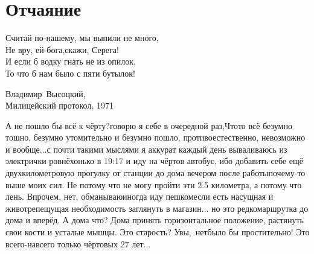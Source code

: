 \chapter{Отчаяние} 
\vepsianrose

\setlength{\epigraphwidth}{0.7\textwidth}

\epigraph{%
	Считай по-нашему, мы выпили не много,\mdash\\
	Не вру, ей-бога,\mdash скажи, Серега!\\
	И если б водку гнать не из опилок,\\
	То что б нам было с пяти бутылок!}
	{
	\begin{flushright}
		\small{Владимир~Высоцкий,\\Милицейский протокол, 1971}
	\end{flushright}
	}


\diagdash А не пошло бы всё к чёрту?\mdash говорю я себе в очередной раз,\mdash Что\sdash то всё безумно тошно, безумно утомительно и безумно пошло, противоестественно, невозможно и вообще$\ldots$\mdash с почти такими мыслями я аккурат каждый день вываливаюсь из электрички ровнёхонько в 19:17 и иду на чёртов автобус, ибо добавить себе ещё двухкилометровую прогулку от станции до дома вечером после работы\mdash почему-то выше моих сил.
Не потому что не могу пройти эти 2.5 километра, а потому что лень. Впрочем, нет, обманываю\mdash иногда иду пешком\mdash если есть насущная и животрепещущая необходимость заглянуть в магазин$\ldots$ но это редко\mdash маршрутка до дома и вперёд. %
А дома что? Дома принять горизонтальное положение, растянуть свои кости и усталые мышцы. Это старость? Увы,~нет\mdash было бы простительно! Это всего-навсего только чёртовых 27 лет$\ldots$

